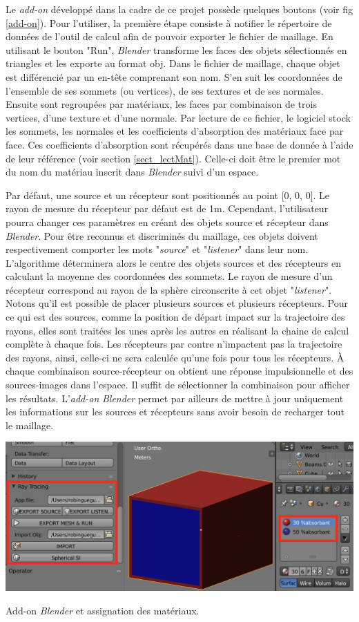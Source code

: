 Le \textit{add-on} développé dans la cadre de ce projet possède quelques boutons (voir fig \ref{add-on}). Pour l'utiliser, la première étape consiste à notifier le répertoire de données de l'outil de calcul afin de pouvoir exporter le fichier de maillage. En utilisant le bouton "Run", \textit{Blender} transforme les faces des objets sélectionnés en triangles et les exporte au format \gls{obj}. Dans le fichier de maillage, chaque objet est différencié par un en-tête comprenant son nom. S'en suit les coordonnées de l'ensemble de ses sommets (ou vertices), de ses textures et de ses normales. Ensuite sont regroupées par matériaux, les faces par combinaison de trois vertices, d'une texture et d'une normale. Par lecture de ce fichier, le logiciel stock les sommets, les normales et les coefficients d'absorption des matériaux face par face. Ces coefficients d'absorption sont récupérés dans une base de donnée à l'aide de leur référence (voir section \ref{sect_lectMat}). Celle-ci doit être le premier mot du nom du matériau inscrit dans \textit{Blender} suivi d'un espace.

Par défaut, une source et un récepteur sont positionnés au point [0, 0, 0]. Le rayon de mesure du récepteur par défaut est de 1m. Cependant, l'utilisateur pourra changer ces paramètres en créant des objets source et récepteur dans \textit{Blender}. Pour être reconnus et discriminés du maillage, ces objets doivent respectivement comporter les mots "\textit{source}" et "\textit{listener}" dans leur nom. L'algorithme déterminera alors le centre des objets sources et des récepteurs en calculant la moyenne des coordonnées des sommets. Le rayon de mesure d'un récepteur correspond au rayon de la sphère circonscrite à cet objet "\textit{listener}". Notons qu'il est possible de placer plusieurs sources et plusieurs récepteurs. Pour ce qui est des sources, comme la position de départ impact sur la trajectoire des rayons, elles sont traitées les unes après les autres en réalisant la chaine de calcul complète à chaque fois. Les récepteurs par contre n'impactent pas la trajectoire des rayons, ainsi, celle-ci ne sera calculée qu'une fois pour tous les récepteurs. À chaque combinaison source-récepteur on obtient une réponse impulsionnelle et des sources-images dans l'espace. Il suffit de sélectionner la combinaison pour afficher les résultats. L'\textit{add-on} \textit{Blender} permet par ailleurs de mettre à jour uniquement les informations sur les sources et récepteurs sans avoir besoin de recharger tout le maillage. 
\begin{figureth}
	\includegraphics[width=\linewidth]{images/add-on}
	\caption{Add-on \textit{Blender} et assignation des matériaux.}
	\label{add-on}
\end{figureth}

